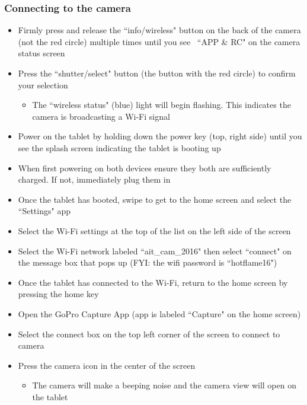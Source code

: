 \documentclass[letterpaper,11pt]{article}
\begin{document}
       
    \subsubsection{Connecting to the camera} 
        \begin{itemize}
        \item Firmly press and release the ``info/wireless" button on the back of
            the camera (not the red circle) multiple times until you see \
            ``APP \& RC" on the camera status screen
        \item Press the ``shutter/select" button (the button with the red 
            circle) to confirm your selection
            \begin{itemize}
            \item The ``wireless status" (blue) light will begin flashing. This 
                indicates the camera is broadcasting a Wi-Fi signal 
            \end{itemize}
        \item Power on the tablet by holding down the power key (top, right side) until you see the
            splash screen indicating the tablet is booting up
        \item When first powering on both devices ensure they both are 
            sufficiently charged. If not, immediately plug them in
        \item Once the tablet has booted, swipe to get to the home screen and 
            select the ``Settings" app
        \item Select the Wi-Fi settings at the top of the list on the left side 
            of the screen
        \item Select the Wi-Fi network labeled ``ait\_cam\_2016" then select 
            ``connect" on the message box that pops up (FYI: the wifi password is
            ``hotflame16")
        \item Once the tablet has connected to the Wi-Fi, return to the home 
            screen by pressing the home key
        \item Open the GoPro Capture App (app is labeled ``Capture" on the home 
            screen) 
        \item Select the connect box on the top left corner of the screen to connect to camera
        \item Press the camera icon in the center of the screen
            \begin{itemize}
            \item The camera will make a beeping noise and the camera view will 
                open on the tablet
            \end{itemize}
        \end{itemize}
    
\end{document}
